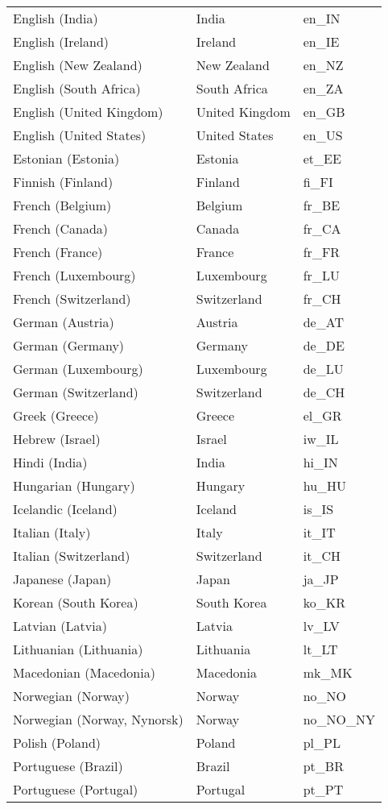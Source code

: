 \begin{supertabular}{|p{4.5cm}p{4.5cm}p{2.2cm}|}
English (India)&India&en\_IN\\
English (Ireland)&Ireland&en\_IE\\
English (New Zealand)&New Zealand&en\_NZ\\
English (South Africa)&South Africa&en\_ZA\\
English (United Kingdom)&United Kingdom&en\_GB\\
English (United States)&United States&en\_US\\
Estonian (Estonia)&Estonia&et\_EE\\
Finnish (Finland)&Finland&fi\_FI\\
French (Belgium)&Belgium&fr\_BE\\
French (Canada)&Canada&fr\_CA\\
French (France)&France&fr\_FR\\
French (Luxembourg)&Luxembourg&fr\_LU\\
French (Switzerland)&Switzerland&fr\_CH\\
German (Austria)&Austria&de\_AT\\
German (Germany)&Germany&de\_DE\\
German (Luxembourg)&Luxembourg&de\_LU\\
German (Switzerland)&Switzerland&de\_CH\\
Greek (Greece)&Greece&el\_GR\\
Hebrew (Israel)&Israel&iw\_IL\\
Hindi (India)&India&hi\_IN\\
Hungarian (Hungary)&Hungary&hu\_HU\\
Icelandic (Iceland)&Iceland&is\_IS\\
Italian (Italy)&Italy&it\_IT\\
Italian (Switzerland)&Switzerland&it\_CH\\
Japanese (Japan)&Japan&ja\_JP\\
Korean (South Korea)&South Korea&ko\_KR\\
Latvian (Latvia)&Latvia&lv\_LV\\
Lithuanian (Lithuania)&Lithuania&lt\_LT\\
Macedonian (Macedonia)&Macedonia&mk\_MK\\
Norwegian (Norway)&Norway&no\_NO\\
Norwegian (Norway, Nynorsk)&Norway&no\_NO\_NY\\
Polish (Poland)&Poland&pl\_PL\\
Portuguese (Brazil)&Brazil&pt\_BR\\
Portuguese (Portugal)&Portugal&pt\_PT\\

\end{supertabular}
